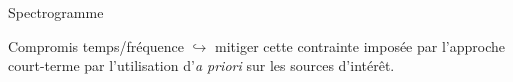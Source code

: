 \begin{frame}{Spectrogramme}
\begin{center}

\end{center}
\end{frame}
%

\begin{frame}{Compromis temps/fréquence}
	$\hookrightarrow{}$ mitiger cette contrainte imposée par l'approche court-terme par l'utilisation d'\alert{\textit{a priori}} sur les sources d'intérêt.
\end{frame}
